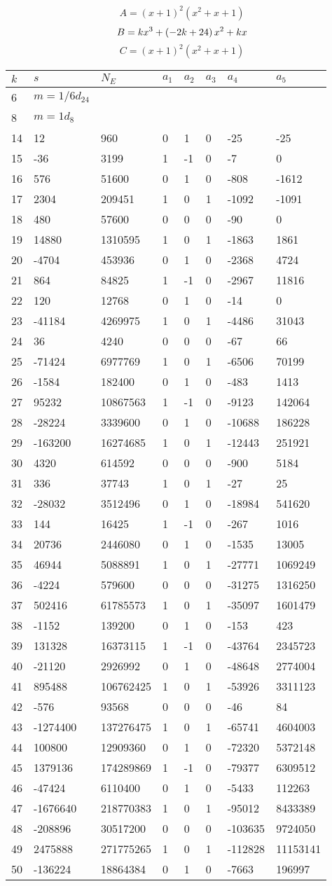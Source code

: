 \documentclass{amsart}
\begin{document}
$$A=(x
 + 1)^{2}(x^2
 + x
 + 1)$$
$$B=k\*x^3
 + \left(-2\*k
 + 24\right) \*x^2
 + k\*x$$
$$C=(x
 + 1)^{2}(x^2
 + x
 + 1)$$
\begin{longtable}{|l|l|l|lllll|}
\hline
$k$ & $s$ & $N_E$ & $a_1$ & $a_2$ & $a_3$ & $a_4$ & $a_5$\\
\hline
6&$m=1/6d_{24}$&&\multicolumn{5}{c|}{}\\
8&$m=1d_{8}$&&\multicolumn{5}{c|}{}\\
14&12&960&0&1&0&-25&-25\\
15&-36&3199&1&-1&0&-7&0\\
16&576&51600&0&1&0&-808&-1612\\
17&2304&209451&1&0&1&-1092&-1091\\
18&480&57600&0&0&0&-90&0\\
19&14880&1310595&1&0&1&-1863&1861\\
20&-4704&453936&0&1&0&-2368&4724\\
21&864&84825&1&-1&0&-2967&11816\\
22&120&12768&0&1&0&-14&0\\
23&-41184&4269975&1&0&1&-4486&31043\\
24&36&4240&0&0&0&-67&66\\
25&-71424&6977769&1&0&1&-6506&70199\\
26&-1584&182400&0&1&0&-483&1413\\
27&95232&10867563&1&-1&0&-9123&142064\\
28&-28224&3339600&0&1&0&-10688&186228\\
29&-163200&16274685&1&0&1&-12443&251921\\
30&4320&614592&0&0&0&-900&5184\\
31&336&37743&1&0&1&-27&25\\
32&-28032&3512496&0&1&0&-18984&541620\\
33&144&16425&1&-1&0&-267&1016\\
34&20736&2446080&0&1&0&-1535&13005\\
35&46944&5088891&1&0&1&-27771&1069249\\
36&-4224&579600&0&0&0&-31275&1316250\\
37&502416&61785573&1&0&1&-35097&1601479\\
38&-1152&139200&0&1&0&-153&423\\
39&131328&16373115&1&-1&0&-43764&2345723\\
40&-21120&2926992&0&1&0&-48648&2774004\\
41&895488&106762425&1&0&1&-53926&3311123\\
42&-576&93568&0&0&0&-46&84\\
43&-1274400&137276475&1&0&1&-65741&4604003\\
44&100800&12909360&0&1&0&-72320&5372148\\
45&1379136&174289869&1&-1&0&-79377&6309512\\
46&-47424&6110400&0&1&0&-5433&112263\\
47&-1676640&218770383&1&0&1&-95012&8433389\\
48&-208896&30517200&0&0&0&-103635&9724050\\
49&2475888&271775265&1&0&1&-112828&11153141\\
50&-136224&18864384&0&1&0&-7663&196997\\
\hline
\end{longtable}
\end{document}
